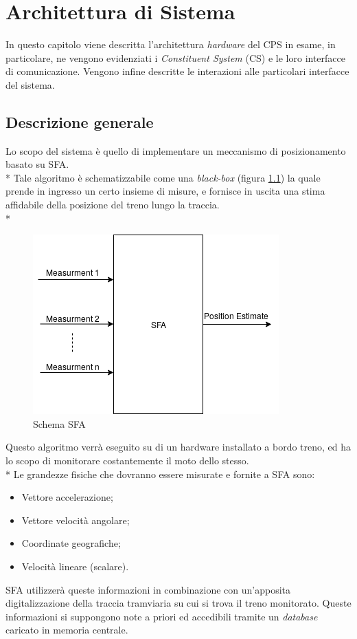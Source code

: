 \chapter{Architettura di Sistema}
In questo capitolo viene descritta l'architettura \emph{hardware} del CPS in esame, in particolare, ne vengono evidenziati i \emph{Constituent System} (CS) e le loro interfacce di comunicazione. Vengono infine descritte le interazioni alle particolari interfacce del sistema.
\section{Descrizione generale}
Lo scopo del sistema \`e quello di implementare un meccanismo di posizionamento basato su SFA.\\*
Tale algoritmo \`e schematizzabile come una \emph{black-box} (figura \ref{fig:sfa}) la quale prende in ingresso un certo insieme di misure, e fornisce in uscita una stima affidabile della posizione del treno lungo la traccia.\\*
\begin{figure}[h]
	\centering
	\includegraphics[scale=0.75]{img/sfaschema}
	\caption{Schema SFA}
	\label{fig:sfa}
\end{figure}
\clearpage
Questo algoritmo verr\`a eseguito su di un hardware installato a bordo treno, ed ha lo scopo di monitorare costantemente il moto dello stesso.\\*
Le grandezze fisiche che dovranno essere misurate e fornite a SFA sono:
\begin{itemize}
	\item Vettore accelerazione;
	\item Vettore velocit\`a angolare;
	\item Coordinate geografiche;
	\item Velocit\`a lineare (scalare).
\end{itemize}
SFA utilizzer\`a queste informazioni in combinazione con un'apposita digitalizzazione della traccia tramviaria su cui si trova il treno monitorato. Queste informazioni si suppongono note a priori ed accedibili tramite un \emph{database} caricato in memoria centrale.
